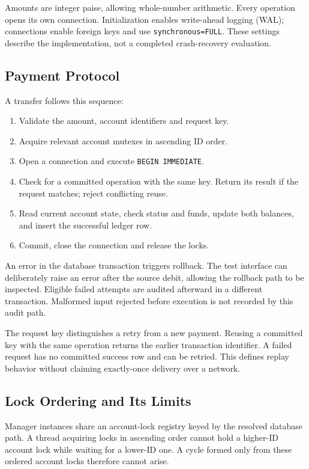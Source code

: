 \documentclass[conference]{IEEEtran}
\begin{document}
Amounts are integer paise, allowing whole-number arithmetic. Every operation opens its own connection. Initialization enables write-ahead logging (WAL); connections enable foreign keys and use \texttt{synchronous=FULL}. These settings describe the implementation, not a completed crash-recovery evaluation.

\subsection{Payment Protocol}
A transfer follows this sequence:
\begin{enumerate}
\item Validate the amount, account identifiers and request key.
\item Acquire relevant account mutexes in ascending ID order.
\item Open a connection and execute \texttt{BEGIN IMMEDIATE}.
\item Check for a committed operation with the same key. Return its result if the request matches; reject conflicting reuse.
\item Read current account state, check status and funds, update both balances, and insert the successful ledger row.
\item Commit, close the connection and release the locks.
\end{enumerate}
An error in the database transaction triggers rollback. The test interface can deliberately raise an error after the source debit, allowing the rollback path to be inspected. Eligible failed attempts are audited afterward in a different transaction. Malformed input rejected before execution is not recorded by this audit path.

The request key distinguishes a retry from a new payment. Reusing a committed key with the same operation returns the earlier transaction identifier. A failed request has no committed success row and can be retried. This defines replay behavior without claiming exactly-once delivery over a network.

\subsection{Lock Ordering and Its Limits}
Manager instances share an account-lock registry keyed by the resolved database path. A thread acquiring locks in ascending order cannot hold a higher-ID account lock while waiting for a lower-ID one. A cycle formed only from these ordered account locks therefore cannot arise.
\end{document}
